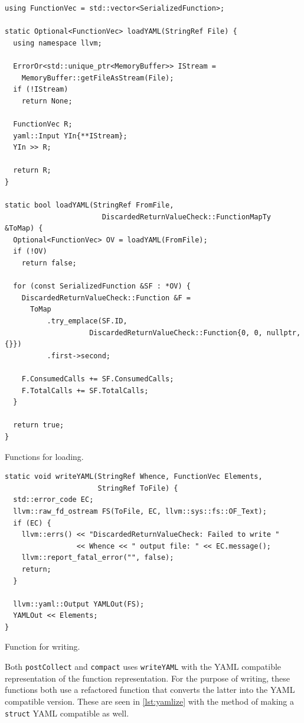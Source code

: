 \begin{listing}[H]
  \begin{verbatim}
using FunctionVec = std::vector<SerializedFunction>;

static Optional<FunctionVec> loadYAML(StringRef File) {
  using namespace llvm;

  ErrorOr<std::unique_ptr<MemoryBuffer>> IStream =
  	MemoryBuffer::getFileAsStream(File);
  if (!IStream)
    return None;

  FunctionVec R;
  yaml::Input YIn{**IStream};
  YIn >> R;

  return R;
}

static bool loadYAML(StringRef FromFile,
					   DiscardedReturnValueCheck::FunctionMapTy &ToMap) {
  Optional<FunctionVec> OV = loadYAML(FromFile);
  if (!OV)
    return false;

  for (const SerializedFunction &SF : *OV) {
    DiscardedReturnValueCheck::Function &F =
      ToMap
    	  .try_emplace(SF.ID,
    				DiscardedReturnValueCheck::Function{0, 0, nullptr, {}})
    	  .first->second;

    F.ConsumedCalls += SF.ConsumedCalls;
    F.TotalCalls += SF.TotalCalls;
  }

  return true;
}
  \end{verbatim}
  \caption{Functions for loading.}\label{lst:load}
\end{listing}

\begin{listing}[H]
  \begin{verbatim}
static void writeYAML(StringRef Whence, FunctionVec Elements,
                      StringRef ToFile) {
  std::error_code EC;
  llvm::raw_fd_ostream FS(ToFile, EC, llvm::sys::fs::OF_Text);
  if (EC) {
    llvm::errs() << "DiscardedReturnValueCheck: Failed to write "
                 << Whence << " output file: " << EC.message();
    llvm::report_fatal_error("", false);
    return;
  }

  llvm::yaml::Output YAMLOut(FS);
  YAMLOut << Elements;
}
  \end{verbatim}
  \caption{Function for writing.}\label{lst:write}
\end{listing}

Both \texttt{postCollect} and \texttt{compact} uses \texttt{writeYAML} with the YAML compatible representation of the function representation. For the
purpose of writing, these functions both use a refactored function that converts the latter into the YAML compatible version. These are seen in
\cref{lst:yamlize} with the method of making a \texttt{struct} YAML compatible as well.

